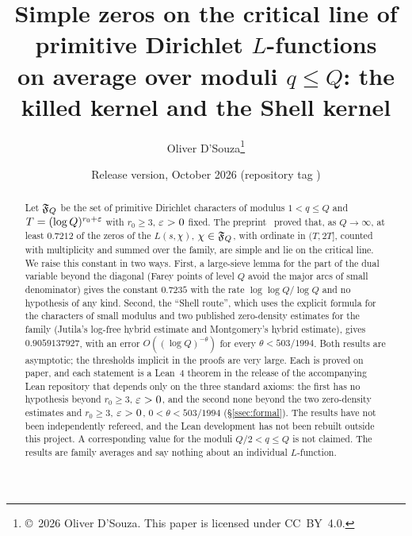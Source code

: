 \documentclass[11pt]{article}
\title{Simple zeros on the critical line of primitive Dirichlet $L$-functions\\ on average over moduli $q\le Q$:
the killed kernel and the Shell kernel}
\author{Oliver D'Souza\thanks{\copyright~2026 Oliver D'Souza. This paper is licensed under CC~BY~4.0.}}
\date{Release version, October 2026 (repository tag \repotag)}
\begin{document}
\maketitle

\begin{abstract}
Let $\mathfrak F_Q$ be the set of primitive Dirichlet characters of modulus $1<q\le Q$ and $T=(\log Q)^{r_0+\varepsilon}$ with $r_0\ge3$, $\varepsilon>0$
fixed. The preprint~\cite{DSouza} proved that, as $Q\to\infty$, at least $0.7212$ of the zeros of the $L(s,\chi)$, $\chi\in\mathfrak F_Q$,
with ordinate in $(T,2T]$, counted with multiplicity and summed over the family, are simple and lie on the critical line. We raise
this constant in two ways. First, a large-sieve lemma for the part of the dual variable beyond the diagonal (Farey points of level
$Q$ avoid the major arcs of small denominator) gives the constant $0.7235$ with the rate $\log\log Q/\log Q$ and no hypothesis of any
kind. Second, the ``Shell route'', which uses the explicit formula for the characters of small modulus and two published
zero-density estimates for the family (Jutila's log-free hybrid estimate and Montgomery's hybrid estimate), gives $0.9059137927$,
with an error $O((\log Q)^{-\theta})$ for every $\theta<503/1994$. Both results are asymptotic; the thresholds implicit in the proofs
are very large. Each is proved on paper, and each statement is a Lean~4 theorem in the release of the accompanying Lean repository
that depends only on the three standard axioms: the first has no hypothesis beyond $r_0\ge3$, $\varepsilon>0$, and the second none beyond the two
zero-density estimates and $r_0\ge3$, $\varepsilon>0$, $0<\theta<503/1994$ (\S\ref{ssec:formal}). The results have not been independently refereed,
and the Lean development has not been rebuilt outside this project. A corresponding value for the moduli $Q/2<q\le Q$ is not claimed. The
results are family averages and say nothing about an individual $L$-function.
\end{abstract}

\tableofcontents
\sloppy










\appendix





\end{document}
